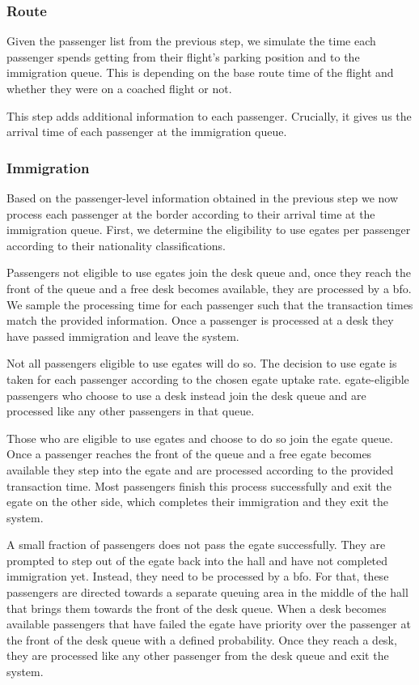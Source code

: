 \documentclass[10pt]{article}
\begin{document}
\subsubsection{Route}

Given the passenger list from the previous step, we simulate the time each passenger spends getting from their flight's parking position and to the immigration queue. This is depending on the base route time 
of the flight and whether they were on a coached flight or not.

This step adds additional information to each passenger. Crucially, it gives us the arrival time of each passenger at the immigration queue. 

\subsubsection{Immigration}

Based on the passenger-level information obtained in the previous step we now process each passenger at the border according to their arrival time at the immigration queue. First, we determine the eligibility to use \glspl{egate} per passenger according to their nationality classifications. 

Passengers not eligible to use \glspl{egate} join the desk queue and, once they reach the front of the queue and a free desk becomes available, they are processed by a \gls{bfo}. We sample the processing time for each passenger such that the transaction times match the provided information. Once a passenger is processed at a desk they have passed immigration and leave the system.

Not all passengers eligible to use \glspl{egate} will do so. The decision to use \gls{egate} is taken for each passenger according to the chosen \gls{egate} uptake rate. \gls{egate}-eligible passengers who choose to use a desk instead join the desk queue and are processed like any other passengers in that queue. 

Those who are eligible to use \glspl{egate} and choose to do so join the \gls{egate} queue. Once a passenger reaches the front of the queue and a free \gls{egate} becomes available they step into the \gls{egate} and are processed according to the provided transaction time. Most passengers finish this process successfully and exit the \gls{egate} on the other side, which completes their immigration and they exit the system.

A small fraction of passengers does not pass the \gls{egate} successfully. They are prompted to step out of the \gls{egate} back into the hall and have not completed immigration yet. Instead, they need to be processed by a \gls{bfo}. For that, these passengers are directed towards a separate queuing area in the middle of the hall that brings them towards the front of the desk queue. When a desk becomes available passengers that have failed the \gls{egate} have priority over the passenger at the front of the desk queue with a defined probability. Once they reach a desk, they are processed like any other passenger from the desk queue and exit the system.
\end{document}
